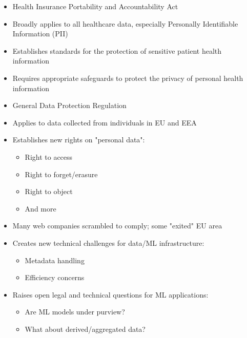 \documentclass[12pt]{article}
\begin{document}
\begin{tcolorbox}[colback=blue!5!white,colframe=blue!75!black,title={HIPAA 1996}]
\begin{itemize}
    \item Health Insurance Portability and Accountability Act
    \item Broadly applies to all healthcare data, especially Personally Identifiable Information (PII)
    \item Establishes standards for the protection of sensitive patient health information
    \item Requires appropriate safeguards to protect the privacy of personal health information
\end{itemize}
\end{tcolorbox}

\begin{tcolorbox}[colback=blue!5!white,colframe=blue!75!black,title={GDPR 2018}]
\begin{itemize}
    \item General Data Protection Regulation
    \item Applies to data collected from individuals in EU and EEA
    \item Establishes new rights on "personal data":
    \begin{itemize}
        \item Right to access
        \item Right to forget/erasure
        \item Right to object
        \item And more
    \end{itemize}
    \item Many web companies scrambled to comply; some "exited" EU area
    \item Creates new technical challenges for data/ML infrastructure:
    \begin{itemize}
        \item Metadata handling
        \item Efficiency concerns
    \end{itemize}
    \item Raises open legal and technical questions for ML applications:
    \begin{itemize}
        \item Are ML models under purview?
        \item What about derived/aggregated data?
    \end{itemize}
\end{itemize}
\end{tcolorbox}
\end{document}
